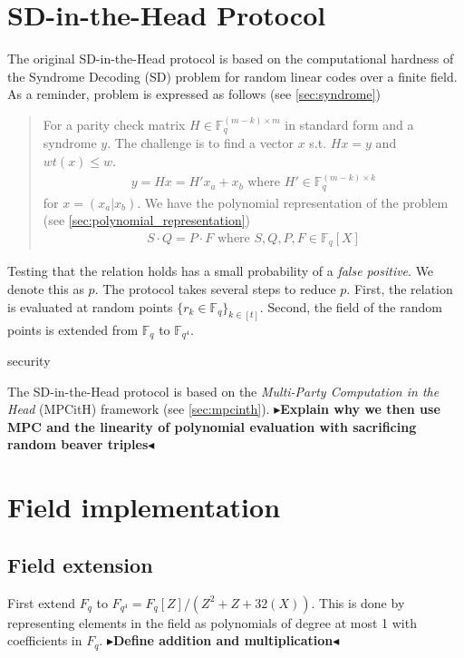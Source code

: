 \documentclass[twoside,11pt]{report}
\theoremstyle{definition}
\theoremstyle{plain}
\newcommand{\todo}[1]{{\color[rgb]{.5,0,0}\textbf{$\blacktriangleright$#1$\blacktriangleleft$}}}
\begin{document}
\section{SD-in-the-Head Protocol}
The original SD-in-the-Head protocol is based on the computational hardness of the Syndrome Decoding (SD) problem for random linear codes over a finite field. As a reminder, problem is expressed as follows (see \autoref{sec:syndrome})
\begin{quote}
  For a parity check matrix $H \in \mathbb{F}_q^{(m-k)\times m}$ in standard form and a syndrome $y$. The challenge is to find a vector $x$ s.t. $Hx = y$ and $wt(x) \leq w$.
  \begin{align*}
    y = Hx = H'x_a + x_b \text{ \ \ \ where \ \ \ } H' \in \mathbb{F}_q^{(m-k)\times k}
  \end{align*}
  for $x = (x_a | x_b)$. We have the polynomial representation of the problem (see \autoref{sec:polynomial_representation})
  \begin{align*}
    S\cdot Q = P\cdot F \text{ \ \ \ where \ \ \ } S, Q, P, F \in \mathbb{F}_q[X]
  \end{align*}
\end{quote}
\noindent Testing that the relation holds has a small probability of a \textit{false positive}. We denote this as $p$. The protocol takes several steps to reduce $p$. First, the relation is evaluated at random points $\{r_k \in \mathbb{F}_q\}_{k\in[t]}$. Second, the field of the random points is extended from $\mathbb{F}_q$ to $\mathbb{F}_{q^4}$.

security

The SD-in-the-Head protocol is based on the \textit{Multi-Party Computation in the Head} (MPCitH) framework (see \autoref{sec:mpcinth}). \todo{Explain why we then use MPC and the linearity of polynomial evaluation with sacrificing random beaver triples}

\section{Field implementation}

\subsection{Field extension}

First extend $F_q$ to $F_{q^4} = F_q[Z] / (Z^2 + Z + 32(X))$. This is done by representing elements in the field as polynomials of degree at most 1 with coefficients in $F_q$. \todo{Define addition and multiplication}
\end{document}
